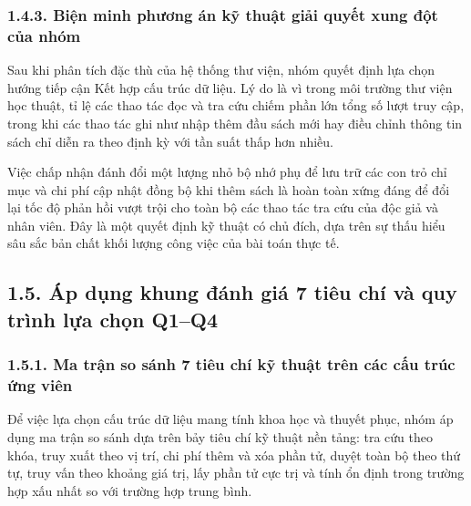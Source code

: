 \documentclass[14pt,a4paper]{extarticle}
\begin{document}
\subsubsection*{1.4.3. Biện minh phương án kỹ thuật giải quyết xung đột của nhóm}

Sau khi phân tích đặc thù của hệ thống thư viện, nhóm quyết định lựa chọn hướng tiếp cận Kết hợp cấu trúc dữ liệu. Lý do là vì trong môi trường thư viện học thuật, tỉ lệ các thao tác đọc và tra cứu chiếm phần lớn tổng số lượt truy cập, trong khi các thao tác ghi như nhập thêm đầu sách mới hay điều chỉnh thông tin sách chỉ diễn ra theo định kỳ với tần suất thấp hơn nhiều.

Việc chấp nhận đánh đổi một lượng nhỏ bộ nhớ phụ để lưu trữ các con trỏ chỉ mục và chi phí cập nhật đồng bộ khi thêm sách là hoàn toàn xứng đáng để đổi lại tốc độ phản hồi vượt trội cho toàn bộ các thao tác tra cứu của độc giả và nhân viên. Đây là một quyết định kỹ thuật có chủ đích, dựa trên sự thấu hiểu sâu sắc bản chất khối lượng công việc của bài toán thực tế.

\subsection*{1.5. Áp dụng khung đánh giá 7 tiêu chí và quy trình lựa chọn Q1--Q4}

\subsubsection*{1.5.1. Ma trận so sánh 7 tiêu chí kỹ thuật trên các cấu trúc ứng viên}

Để việc lựa chọn cấu trúc dữ liệu mang tính khoa học và thuyết phục, nhóm áp dụng ma trận so sánh dựa trên bảy tiêu chí kỹ thuật nền tảng: tra cứu theo khóa, truy xuất theo vị trí, chi phí thêm và xóa phần tử, duyệt toàn bộ theo thứ tự, truy vấn theo khoảng giá trị, lấy phần tử cực trị và tính ổn định trong trường hợp xấu nhất so với trường hợp trung bình.
\end{document}
